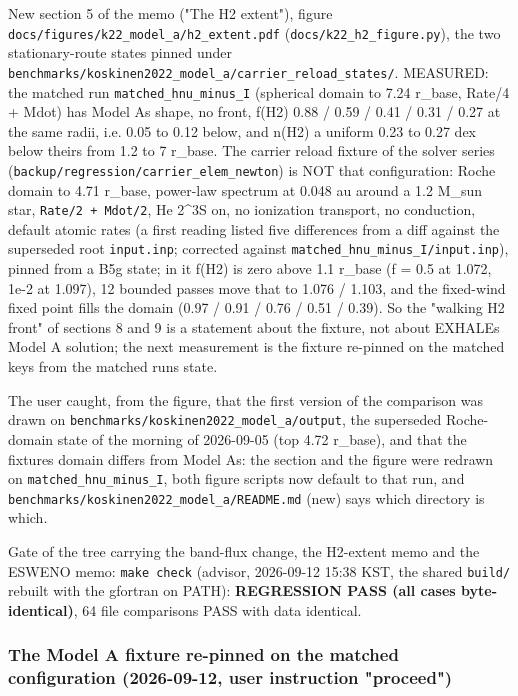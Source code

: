 \documentclass[english,a4paper]{my_memo}
\begin{document}
New section 5 of the memo ("The H2 extent"), figure
\texttt{docs/figures/k22\_model\_a/h2\_extent.pdf} (\texttt{docs/k22\_h2\_figure.py}), the two
stationary-route states pinned under
\texttt{benchmarks/koskinen2022\_model\_a/carrier\_reload\_states/}. MEASURED: the
matched run \texttt{matched\_hnu\_minus\_I} (spherical domain to 7.24 r\_base, Rate/4 +
Mdot) has Model A\textquotesingle s shape, no front, f(H2) 0.88 / 0.59 / 0.41 / 0.31 / 0.27
at the same radii, i.e. 0.05 to 0.12 below, and n(H2) a uniform 0.23 to
0.27 dex below theirs from 1.2 to 7 r\_base. The carrier reload fixture of
the solver series (\texttt{backup/regression/carrier\_elem\_newton}) is NOT that
configuration: Roche domain to 4.71 r\_base, power-law spectrum at 0.048 au
around a 1.2 M\_sun star, \texttt{Rate/2\ +\ Mdot/2}, He 2\^{}3S on, no ionization
transport, no conduction, default atomic rates (a first reading listed five
differences from a diff against the superseded root \texttt{input.inp}; corrected
against \texttt{matched\_hnu\_minus\_I/input.inp}), pinned from a B5g state; in it f(H2)
is zero above 1.1 r\_base (f = 0.5 at 1.072, 1e-2 at 1.097), 12 bounded
passes move that to 1.076 / 1.103, and the fixed-wind fixed point fills the
domain (0.97 / 0.91 / 0.76 / 0.51 / 0.39). So the "walking H2 front" of
sections 8 and 9 is a statement about the fixture, not about EXHALE\textquotesingle s Model
A solution; the next measurement is the fixture re-pinned on the matched
keys from the matched run\textquotesingle s state.

The user caught, from the figure, that the first version of the comparison
was drawn on \texttt{benchmarks/koskinen2022\_model\_a/output}, the superseded
Roche-domain state of the morning of 2026-09-05 (top 4.72 r\_base), and that
the fixture\textquotesingle s domain differs from Model A\textquotesingle s: the section and the figure were
redrawn on \texttt{matched\_hnu\_minus\_I}, both figure scripts now default to that
run, and \texttt{benchmarks/koskinen2022\_model\_a/README.md} (new) says which
directory is which.

Gate of the tree carrying the band-flux change, the H2-extent memo and the
ESWENO memo: \texttt{make\ check} (advisor, 2026-09-12 15:38 KST, the shared
\texttt{build/} rebuilt with the gfortran on PATH): \textbf{REGRESSION PASS (all cases
byte-identical)}, 64 file comparisons PASS with data identical.

\subsubsection{The Model A fixture re-pinned on the matched configuration (2026-09-12, user instruction "proceed")}\label{the-model-a-fixture-re-pinned-on-the-matched-configuration-2026-09-12-user-instruction-proceed}
\end{document}
